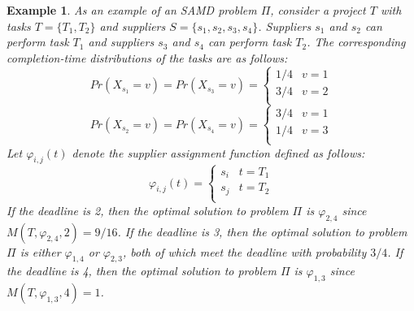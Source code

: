 \documentclass[letterpaper]{article} %
\newtheorem{example}{Example}
\newcommand{\samd}{\ac{SAMD}\xspace}
\begin{document}
\begin{example}
As an example of an \samd problem $\Pi$, consider a project $T$ with tasks $T=\{T_1, T_2\}$ and suppliers $S=\{s_1, s_2, s_3, s_4\}$.
Suppliers $s_1$ and $s_2$ can perform task $T_1$
and suppliers $s_3$ and $s_4$ can perform task $T_2$.
The corresponding completion-time distributions of the tasks are as follows:
\[ Pr(X_{s_1}=v)=Pr(X_{s_3}=v)=
\begin{cases}
      1/4 & v=1\\
      3/4 & v=2\\
\end{cases}
\]
\[ Pr(X_{s_2}=v)=Pr(X_{s_4}=v)=
\begin{cases}
      3/4 & v=1\\
      1/4 & v=3\\
\end{cases}
\]
Let $\varphi_{i,j}(t)$ denote the supplier assignment function defined as follows:
\[\varphi_{i,j}(t)=
\begin{cases}
      s_i & t=T_1\\
      s_j & t=T_2\\
\end{cases}\]
If the deadline is 2, then the optimal solution to problem $\Pi$ is $\varphi_{2,4}$
since $M(T, \varphi_{2,4}, 2)=9/16$.
If the deadline is 3, then the optimal solution to problem $\Pi$ is either $\varphi_{1,4}$
or $\varphi_{2,3}$, both of which meet the deadline with probability $3/4$. If the deadline is 4, then the optimal solution to problem $\Pi$ is $\varphi_{1,3}$  since $M(T, \varphi_{1,3}, 4)=1$.
\end{example}




\end{document}
